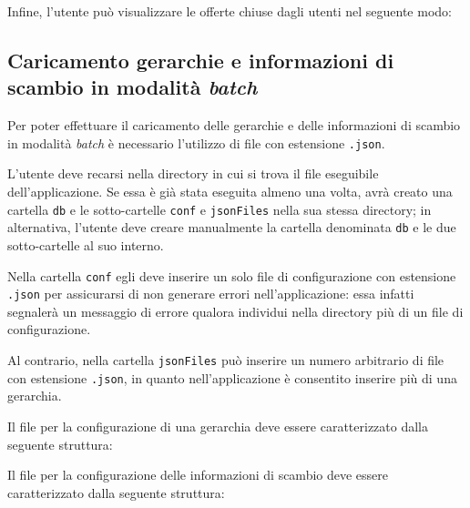 Infine, l'utente può visualizzare le offerte chiuse dagli utenti nel seguente modo:


\subsection{Caricamento gerarchie e informazioni di scambio in modalità \textit{batch}}
Per poter effettuare il caricamento delle gerarchie e delle informazioni di scambio in modalità \textit{batch} è necessario l'utilizzo di file con estensione \texttt{.json}. 

L'utente deve recarsi nella directory in cui si trova il file eseguibile dell'applicazione. Se essa è già stata eseguita almeno una volta, avrà creato una cartella \texttt{db} e le sotto-cartelle \texttt{conf} e \texttt{jsonFiles} nella sua stessa directory; in alternativa, l'utente deve creare manualmente la cartella denominata \texttt{db} e le due sotto-cartelle al suo interno.

Nella cartella \texttt{conf} egli deve inserire un solo file di configurazione con estensione \texttt{.json} per assicurarsi di non generare errori nell'applicazione: essa infatti segnalerà un messaggio di errore qualora individui nella directory più di un file di configurazione. 

Al contrario, nella cartella \texttt{jsonFiles} può inserire un numero arbitrario di file con estensione \texttt{.json}, in quanto nell'applicazione è consentito inserire più di una gerarchia. 

Il file per la configurazione di una gerarchia deve essere caratterizzato dalla seguente struttura:


Il file per la configurazione delle informazioni di scambio deve essere caratterizzato dalla seguente struttura:

